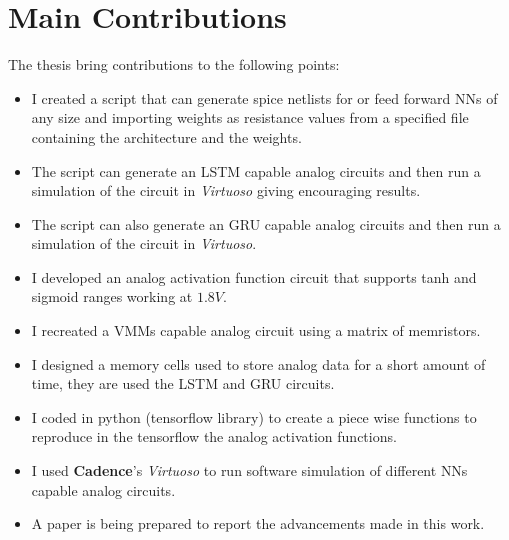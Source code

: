 \section{Main Contributions}
\label{sec:contributions}

The thesis bring contributions to the following points:

\begin{itemize}
  \item I created a script that can generate spice netlists for  or feed forward \aclp{NN} of any size and importing weights as resistance values from a specified file containing the architecture and the weights.
  \item The script can generate an \ac{LSTM} capable analog circuits and then run a simulation of the circuit in \textit{Virtuoso} giving encouraging results.
  \item The script can also generate an \ac{GRU} capable analog circuits and then run a simulation of the circuit in \textit{Virtuoso}.
  \item I developed an analog activation function circuit that supports \ac{tanh} and sigmoid ranges working at $1.8V$.
  \item I recreated a \acp{VMM} capable analog circuit using a matrix of memristors.
  \item I designed a memory cells used to store analog data for a short amount of time, they are used the \ac{LSTM} and \ac{GRU} circuits.
  \item I coded in python \cite{python} (tensorflow library\cite{tensorflow}) to create a piece wise functions to reproduce in the tensorflow the analog activation functions.
  \item I used \textbf{Cadence}'s \textit{Virtuoso} to run software simulation of different \acp{NN} capable analog circuits.
  \item A paper is being prepared to report the advancements made in this work.
\end{itemize}

